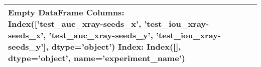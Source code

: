 \begin{tabular}{lllll}
\toprule
Empty DataFrame
Columns: Index(['test\_auc\_xray-seeds\_x', 'test\_iou\_xray-seeds\_x',
       'test\_auc\_xray-seeds\_y', 'test\_iou\_xray-seeds\_y'],
      dtype='object')
Index: Index([], dtype='object', name='experiment\_name') \\
\bottomrule
\end{tabular}
